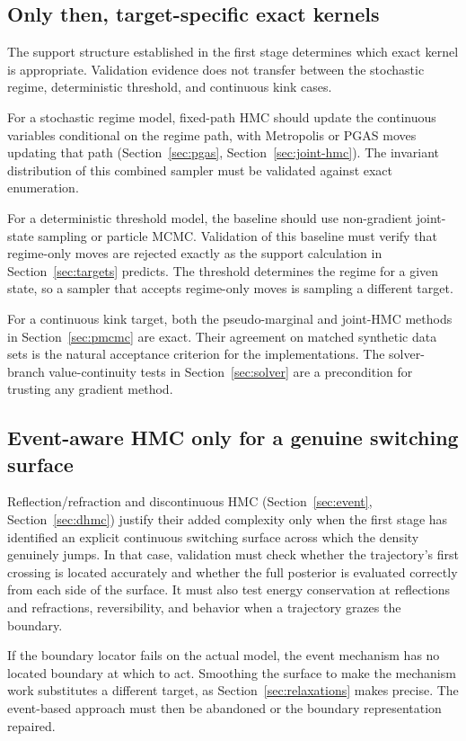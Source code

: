 \documentclass[11pt]{article}
\begin{document}
\subsection*{Only then, target-specific exact kernels}

The support structure established in the first stage determines which exact
kernel is appropriate. Validation evidence does not transfer between the
stochastic regime, deterministic threshold, and continuous kink cases.

For a stochastic regime model, fixed-path HMC should update the continuous
variables conditional on the regime path, with Metropolis or PGAS moves
updating that path (Section~\ref{sec:pgas}, Section~\ref{sec:joint-hmc}). The invariant distribution of this combined sampler must be
validated against exact enumeration.

For a deterministic threshold model, the baseline should use non-gradient
joint-state sampling or particle MCMC. Validation of this baseline must
verify that regime-only moves are rejected exactly as the support calculation
in Section~\ref{sec:targets} predicts. The threshold determines the regime for a given
state, so a sampler that accepts regime-only moves is sampling a different
target.

For a continuous kink target, both the pseudo-marginal and joint-HMC methods
in Section~\ref{sec:pmcmc} are exact. Their agreement on matched synthetic data sets
is the natural acceptance criterion for the implementations. The
solver-branch value-continuity tests in Section~\ref{sec:solver} are a precondition for
trusting any gradient method.

\subsection*{Event-aware HMC only for a genuine switching surface}

Reflection/refraction and discontinuous HMC (Section~\ref{sec:event}, Section~\ref{sec:dhmc})
justify their added complexity only when the first stage has identified an
explicit continuous switching surface across which the density genuinely
jumps. In that case, validation must check whether the trajectory's first
crossing is located accurately and whether the full posterior is evaluated
correctly from each side of the surface. It must also test energy conservation
at reflections and refractions, reversibility, and behavior when a trajectory
grazes the boundary.

If the boundary locator fails on the actual model, the event mechanism has no
located boundary at which to act. Smoothing the surface to make the mechanism
work substitutes a different target, as Section~\ref{sec:relaxations} makes precise.
The event-based approach must then be abandoned or the boundary representation
repaired.
\end{document}
